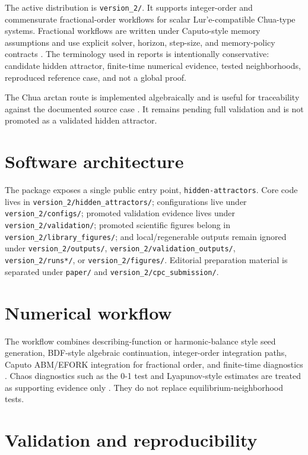 \documentclass[preprint,12pt]{elsarticle}
\begin{document}
The active distribution is \texttt{version\_2/}. It supports integer-order and commensurate fractional-order workflows for scalar Lur'e-compatible Chua-type systems. Fractional workflows are written under Caputo-style memory assumptions and use explicit solver, horizon, step-size, and memory-policy contracts \cite{podlubny_fractional_1999}. The terminology used in reports is intentionally conservative: candidate hidden attractor, finite-time numerical evidence, tested neighborhoods, reproduced reference case, and not a global proof.

The Chua arctan route is implemented algebraically and is useful for traceability against the documented source case \cite{wu_chua_arctan_2023}. It remains pending full validation and is not promoted as a validated hidden attractor.

\section{Software architecture}

The package exposes a single public entry point, \texttt{hidden-attractors}. Core code lives in \texttt{version\_2/hidden\_attractors/}; configurations live under \texttt{version\_2/configs/}; promoted validation evidence lives under \texttt{version\_2/validation/}; promoted scientific figures belong in \texttt{version\_2/library\_figures/}; and local/regenerable outputs remain ignored under \texttt{version\_2/outputs/}, \texttt{version\_2/validation\_outputs/}, \texttt{version\_2/runs*/}, or \texttt{version\_2/figures/}. Editorial preparation material is separated under \texttt{paper/} and \texttt{version\_2/cpc\_submission/}.

\section{Numerical workflow}

The workflow combines describing-function or harmonic-balance style seed generation, BDF-style algebraic continuation, integer-order integration paths, Caputo ABM/EFORK integration for fractional order, and finite-time diagnostics \cite{diethelm_abm_fractional_2002,ghoreishi_ghaffari_saad_efork_2023,khalil_nonlinear_2002}. Chaos diagnostics such as the 0-1 test and Lyapunov-style estimates are treated as supporting evidence only \cite{gottwald_melbourne_2004,wolf_lyapunov_1985}. They do not replace equilibrium-neighborhood tests.

\section{Validation and reproducibility}
\end{document}
